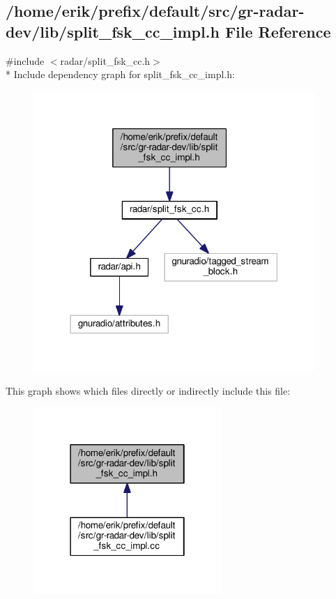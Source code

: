 \subsection{/home/erik/prefix/default/src/gr-\/radar-\/dev/lib/split\+\_\+fsk\+\_\+cc\+\_\+impl.h File Reference}
\label{split__fsk__cc__impl_8h}
{\ttfamily \#include $<$radar/split\+\_\+fsk\+\_\+cc.\+h$>$}\\*
Include dependency graph for split\+\_\+fsk\+\_\+cc\+\_\+impl.\+h\+:
\nopagebreak
\begin{figure}[H]
\begin{center}
\leavevmode
\includegraphics[width=302pt]{d0/d03/split__fsk__cc__impl_8h__incl}
\end{center}
\end{figure}
This graph shows which files directly or indirectly include this file\+:
\nopagebreak
\begin{figure}[H]
\begin{center}
\leavevmode
\includegraphics[width=202pt]{d9/dce/split__fsk__cc__impl_8h__dep__incl}
\end{center}
\end{figure}
